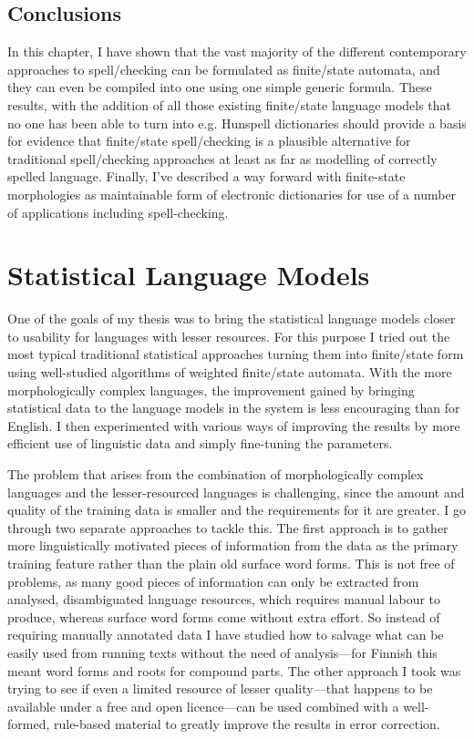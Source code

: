 \documentclass[officiallayout]{unihelcompling}
\begin{document}
\section{Conclusions}

In this chapter, I have shown that the vast majority of the different
contemporary approaches to spell\-/checking can be formulated as finite\-/state
automata, and they can even be compiled into one using one simple generic
formula. These results, with the addition of all those existing finite\-/state
language models that no one has been able to turn into e.g. Hunspell
dictionaries should provide a basis for evidence that finite\-/state
spell\-/checking is a plausible alternative for traditional spell\-/checking
approaches at least as far as modelling of correctly spelled language. Finally,
I've described a way forward with finite-state morphologies as maintainable
form of electronic dictionaries for use of a number of applications including
spell-checking.

\chapter{Statistical Language Models}
\label{chap:statistical-models}

One of the goals of my thesis was to bring the statistical \glspl{language
model} closer to usability for  languages with lesser resources. For this
purpose I tried out the most typical traditional statistical approaches turning
them into finite\-/state form using well-studied algorithms of weighted
finite\-/state automata. With the more morphologically complex languages, the
improvement gained by bringing statistical data to the language models in the
system is less encouraging than for English. I then experimented with various
ways of improving the results by more efficient use of linguistic data and
simply fine-tuning the parameters.

The problem that arises from the combination of morphologically complex
languages and the lesser-resourced languages is challenging, since the amount
and quality of the training data is smaller and the requirements for it are
greater. I go through two separate approaches to tackle this. The first
approach is to gather more linguistically motivated pieces of information from
the data as the primary training feature rather than the plain old surface
word forms. This is not free of problems, as many good pieces of information
can only be extracted from analysed, disambiguated language resources,
which requires manual labour to produce, whereas surface word forms
come without extra effort. So instead of requiring manually annotated data I
have studied how to salvage what can be easily used from running texts without
the need of analysis---for Finnish this meant word forms and roots for compound
parts. The other approach I took was trying to see if even a limited
resource of lesser quality---that happens to be available under a free and open
licence---can be used combined with a well-formed, rule-based material to
greatly improve the results in error correction.
\end{document}
